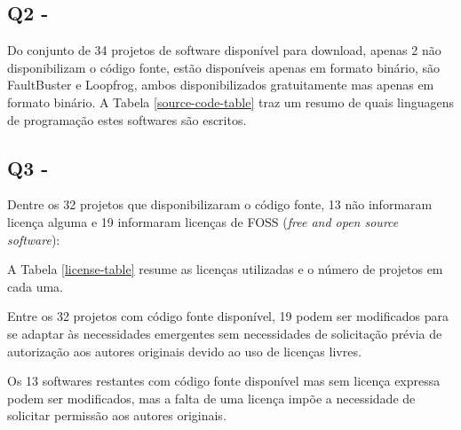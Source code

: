 \subsection{Q2 - \EstudoUmQuestaoDois}

Do conjunto de 34 projetos de software disponível para download, apenas 2 não
disponibilizam o código fonte, estão disponíveis apenas em formato binário, são
FaultBuster e Loopfrog, ambos disponibilizados gratuitamente mas apenas em
formato binário. A Tabela \ref{source-code-table} traz um resumo de quais
linguagens de programação estes softwares são escritos.




\subsection{Q3 - \EstudoUmQuestaoTres}


Dentre os 32 projetos que disponibilizaram o código fonte, 13 não informaram
licença alguma e 19 informaram licenças de FOSS ({\it free and open source
software}):



A Tabela \ref{license-table} resume as licenças utilizadas e o número de
projetos em cada uma.

Entre os 32 projetos com código fonte disponível, 19 podem ser modificados para
se adaptar às necessidades emergentes sem necessidades de solicitação prévia de
autorização aos autores originais devido ao uso de licenças livres. 

Os 13 softwares restantes com código fonte disponível mas sem licença expressa
podem ser modificados, mas a falta de uma licença impõe a necessidade de
solicitar permissão aos autores originais.

